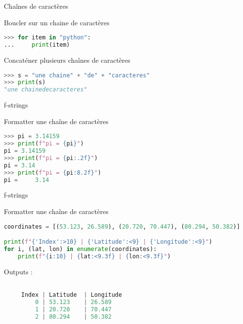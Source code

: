 \begin{frame}[fragile]{Chaînes de caractères}

  \begin{block}{Boucler sur un chaine de caractères}
    \medskip
\begin{lstlisting}[language=Python, numbers=none]
>>> for item in "python":
...     print(item)
\end{lstlisting}
  \end{block}

  \begin{block}{Concaténer plusieurs chaînes de caractères}
  \medskip
\begin{lstlisting}[language=Python, numbers=none]
>>> s = "une chaine" + "de" + "caracteres"
>>> print(s)
"une chainedecaracteres"
\end{lstlisting}
  \end{block}

\end{frame}


\begin{frame}[fragile]{f-strings}

  \begin{block}{Formatter une chaîne de caractères}
    \medskip
\begin{lstlisting}[language=Python, numbers=none]
>>> pi = 3.14159
>>> print(f"pi = {pi}")
pi = 3.14159
>>> print(f"pi = {pi:.2f}")
pi = 3.14
>>> print(f"pi = {pi:8.2f}")
pi =     3.14
\end{lstlisting}
  \end{block}
\end{frame}

\begin{frame}[fragile]{f-strings}

  \begin{block}{Formatter une chaîne de caractères}
    \medskip
\begin{lstlisting}[language=Python, numbers=none]
coordinates = [(53.123, 26.589), (20.720, 70.447), (80.294, 50.382)]

print(f"{'Index':>10} | {'Latitude':<9} | {'Longitude':<9}")
for i, (lat, lon) in enumerate(coordinates):
    print(f"{i:10} | {lat:<9.3f} | {lon:<9.3f}")

\end{lstlisting}
Outputs :
\begin{lstlisting}[language=Python, numbers=none]

     Index | Latitude  | Longitude
         0 | 53.123    | 26.589   
         1 | 20.720    | 70.447   
         2 | 80.294    | 50.382  

\end{lstlisting}
  \end{block}
\end{frame}



